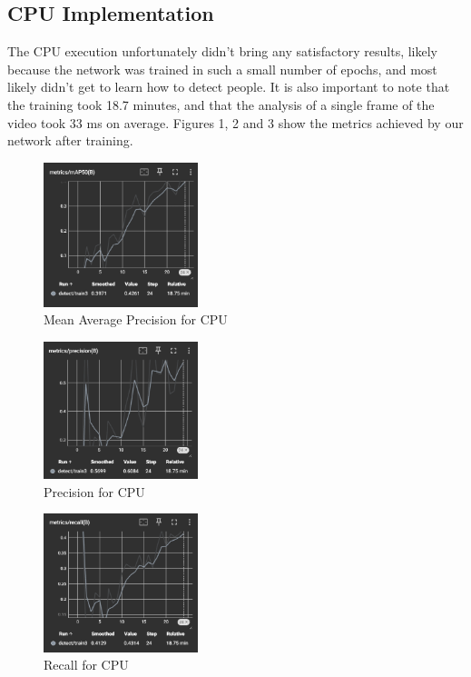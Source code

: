 \documentclass[conference]{IEEEtran}
\begin{document}
\subsection{CPU Implementation}
The CPU execution unfortunately didn't bring any satisfactory results, likely because the network was trained in such a small number of epochs, and most likely didn't get to learn how to detect people. It is also important to note that the training took 18.7 minutes, and that the analysis of a single frame of the video took 33 ms on average. Figures 1, 2 and 3 show the metrics achieved by our network after training.

\begin{figure}[ht!]
    \centering
    \includegraphics[width=0.4\textwidth]{Images/CPU/Screenshot 2024-01-27 185829.png}
    \caption{Mean Average Precision for CPU}\label{fig:CPUmAP}
\end{figure}

\begin{figure}[ht!]
    \centering
    \includegraphics[width=0.4\textwidth]{Images/CPU/Screenshot 2024-01-27 185928.png}
    \caption{Precision for CPU}\label{fig:CPUprecision}
\end{figure}

\begin{figure}[ht!]
    \centering
    \includegraphics[width=0.4\textwidth]{Images/CPU/Screenshot 2024-01-27 185951.png}
    \caption{Recall for CPU}\label{fig:CPUrecall}
\end{figure}
\end{document}
